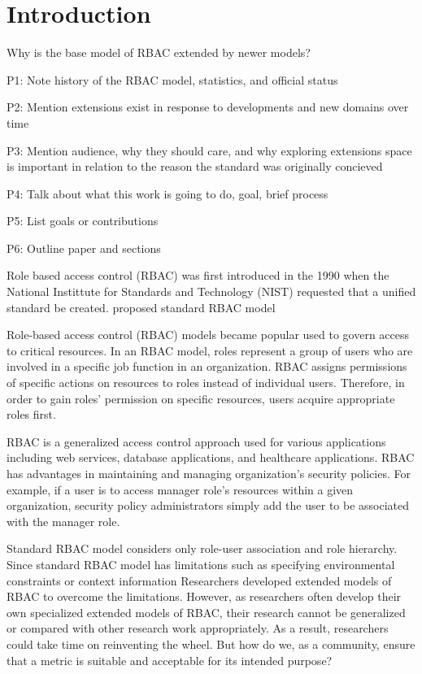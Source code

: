 \section{Introduction} \label{sec:introduction}

Why is the base model of RBAC extended by newer models?

P1: Note history of the RBAC model, statistics, and official status

P2: Mention extensions exist in response to developments and new domains over time

P3: Mention audience, why they should care, and why exploring extensions space is important in relation to the reason the standard was originally concieved

P4: Talk about what this work is going to do, goal, brief process

P5: List goals or contributions

P6: Outline paper and sections


Role based access control (RBAC) was first introduced in the 1990 when the National Instittute for Standards and Technology (NIST) requested that a unified standard be created.  proposed standard RBAC model \cite{ferraiolo}

Role-based access control (RBAC) models \cite{ferraiolo} became popular used to govern access to critical resources.  In an RBAC model, roles represent a group of users who are involved in a specific job function in an organization. RBAC assigns permissions of specific actions on resources to roles instead of individual users.  Therefore, in order to gain roles' permission on specific resources, users acquire appropriate roles first.

RBAC is a generalized access control approach used for various applications including web services, database applications, and healthcare applications.  RBAC has advantages in maintaining and managing organization's security policies.  For example, if a user is to access manager role's resources within a given organization, security policy administrators simply add the user to be associated with the manager role.

Standard RBAC model considers only role-user association and role hierarchy.
Since standard RBAC model has limitations such as specifying environmental constraints or context information
Researchers developed extended models of RBAC to overcome the limitations.
However, as researchers often develop their own specialized extended models of RBAC,
their research cannot be generalized or compared with other research work appropriately.
As a result, researchers could take time on reinventing the wheel.
But how do we, as a community, ensure that a metric is suitable and acceptable for its intended purpose?

